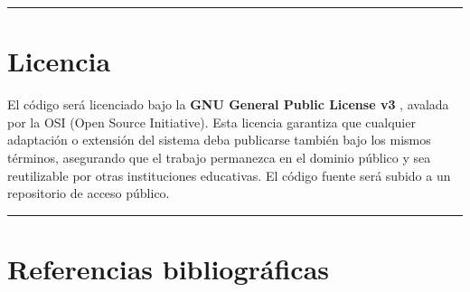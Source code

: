 \documentclass[
  spanish,
]{article}
\begin{document}
\begin{center}\rule{0.5\linewidth}{0.5pt}\end{center}

\section{Licencia}\label{licencia}

El código será licenciado bajo la \textbf{GNU General Public License v3}
\citep{fsf2007gplv3}, avalada por la OSI (Open Source Initiative). Esta licencia garantiza que
cualquier adaptación o extensión del sistema deba publicarse también bajo
los mismos términos, asegurando que el trabajo permanezca en el dominio
público y sea reutilizable por otras instituciones educativas. El código
fuente será subido a un repositorio de acceso público.

\begin{center}\rule{0.5\linewidth}{0.5pt}\end{center}

\section*{Referencias bibliográficas}



\end{document}

